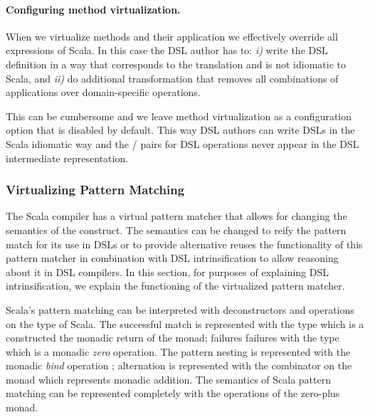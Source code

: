  \paragraph{Configuring method virtualization.} When we virtualize methods and their application
   we effectively override all expressions of Scala. In this case the DSL author has to:
   \emph{i)} write the DSL definition in a way that corresponds to the translation and is not idiomatic to Scala,
   and \emph{ii)} do additional transformation that removes all combinations of applications over domain-specific operations.

   This can be cumbersome and we leave method virtualization as a configuration option that is
    disabled by default. This way DSL authors can write DSLs in the
    Scala idiomatic way and the / pairs for DSL operations never appear in the
    DSL intermediate representation.


\newcommand{\ttname}{\tau}


\newcommand{\ttarg}[1][]{\ttname_{\mathtt{arg}} \ifempty{#1}{}{(#1)}}
\newcommand{\ttother}[1][]{\ttname \ifempty{#1}{}{(#1)}}

\subsubsection{Virtualizing Pattern Matching}
\label{sec:virtpatmat}

The Scala compiler has a virtual pattern matcher that allows for changing the semantics
 of the construct. The semantics can be changed to reify the pattern match for its use
 in DSLs or to provide alternative \yy reuses the functionality of this pattern matcher
 in combination with DSL intrinsification to allow reasoning about it in DSL compilers.
 In this section, for purposes of explaining DSL intrinsification, we explain the functioning
 of the virtualized pattern matcher.

Scala's pattern matching can be interpreted with deconstructors and operations on the 
 type of Scala. The successful match is represented with the  type which is
 a constructed the monadic return of the  monad; failures failures with the
  type which is a monadic \emph{zero} operation.
 The pattern nesting is represented with the monadic \emph{bind} operation ; alternation is represented with the
  combinator on the  monad which represents monadic addition. The semantics
 of Scala pattern matching can be represented completely with the operations of the zero-plus monad.


